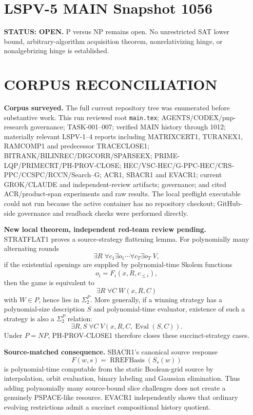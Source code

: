 \documentclass[11pt]{article}
\begin{document}
\section*{LSPV-5 MAIN Snapshot 1056}

\textbf{STATUS: OPEN.} P versus NP remains open. No unrestricted SAT lower bound,
arbitrary-algorithm acquisition theorem, nonrelativizing hinge, or nonalgebrizing hinge is established.

\section*{CORPUS RECONCILIATION}
\textbf{Corpus surveyed.}
The full current repository tree was enumerated before substantive work. This run reviewed root
\texttt{main.tex}; AGENTS/CODEX/pnp-research governance; TASK-001--007; verified MAIN history through
1012; materially relevant LSPV-1--4 reports including MATRIXCERT1, TURANEX1, RAMCOMP1 and predecessor
TRACECLOSE1; BITRANK/BILINREC/DIGCORR/SPARSEEX; PRIME-LQP/PRIMECRT/PH-PROV-CLOSE;
HEC/VSC-HEC/G-PPC-HEC/CRS-PPC/CCSPC/RCCN/Search--G; ACR1, SBACR1 and EVACR1; current
GROK/CLAUDE and independent-review artifacts; governance; and cited ACR/product-span experiments and
raw results. The local preflight executable could not run because the active container has no
repository checkout; GitHub-side governance and readback checks were performed directly.

\textbf{New local theorem, independent red-team review pending.}
STRATFLAT1 proves a source-strategy flattening lemma. For polynomially many alternating rounds
\[
\exists R\;\forall c_1\exists o_1\cdots\forall c_T\exists o_T\;V,
\]
if the existential openings are supplied by polynomial-time Skolem functions
\[
o_i=F_i(x,R,c_{\le i}),
\]
then the game is equivalent to
\[
\boxed{\exists R\;\forall C\;W(x,R,C)}
\]
with \(W\in P\), hence lies in \(\Sigma_2^P\). More generally, if a winning strategy has a
polynomial-size description \(S\) and polynomial-time evaluator, existence of such a strategy is
also a \(\Sigma_2^P\) relation:
\[
\exists R,S\;\forall C\;V(x,R,C,\operatorname{Eval}(S,C)).
\]
Under \(P=NP\), PH-PROV-CLOSE1 therefore closes these succinct-strategy cases.

\textbf{Source-matched consequence.}
SBACR1's canonical source response
\[
F(w,s)=\operatorname{RREFBasis}(S_s(w))
\]
is polynomial-time computable from the static Boolean-grid source by interpolation, orbit
evaluation, binary labeling and Gaussian elimination. Thus adding polynomially many source-bound
slice challenges does not create a genuinely PSPACE-like resource. EVACR1 independently shows that
ordinary evolving restrictions admit a succinct compositional history quotient.
\end{document}

